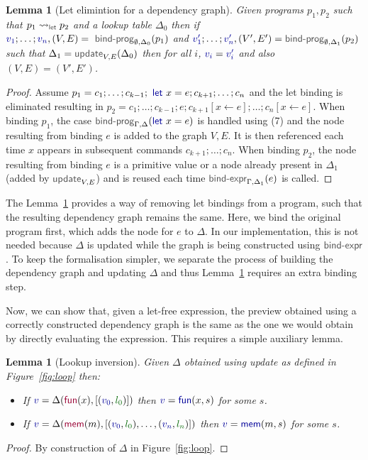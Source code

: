 \documentclass[acmsmall,anonymous,fleqn]{acmart}\settopmatter{printfolios=false,printccs=false,printacmref=false}
\newcounter{thc}
\theoremstyle{plain}
\newtheorem{lem}[thc]{Lemma}
\theoremstyle{definition}
\newcommand{\ident}[1]{\textnormal{\textcolor{idclr}{\sffamily #1}}}
\newcommand{\kvd}[1]{\textnormal{\textcolor{kvdclr}{\sffamily #1}}}
\newcommand{\bndclr}[1]{\textcolor{kvdclr}{#1}}
\newcommand{\blblclr}[1]{\textcolor{numclr}{#1}}
\newcommand{\bnd}[1]{\textnormal{\textcolor{kvdclr}{\sffamily #1}}}
\newcommand{\bknd}[1]{\textnormal{\textcolor{prepclr}{\sffamily #1}}}
\begin{document}
\begin{lem}[Let elimintion for a dependency graph]
\label{thm:let-grp-elimination}
Given programs $p_1, p_2$ such that $p_1 \rightsquigarrow_\ident{let} p_2$ and a lookup table
$\Delta_0$ then if $\bndclr{v_1}; \ldots; \bndclr{v_n}, (V, E) = \ident{bind-prog}_{\emptyset, \Delta_0}(p_1)$ and
$\bndclr{v'_1};\ldots;\bndclr{v'_n}, (V', E') = \ident{bind-prog}_{\emptyset, \Delta_1}(p_2)$ such that $\Delta_1 = \ident{update}_{V, E}(\Delta_0)$
then for all $i$, $\bndclr{v_i} = \bndclr{v'_i}$ and also $(V, E) = (V', E')$.
\end{lem}
\begin{proof}
Assume $p_1 = c_1; \ldots; c_{k-1}; \kvd{let}~x=e; c_{k+1};\ldots; c_n$ and the let binding is
eliminated resulting in $p_2 = c_1; \ldots; c_{k-1}; e; c_{k+1}[x\leftarrow e];\ldots; c_n[x\leftarrow e]$.
When binding $p_1$, the case $\ident{bind-prog}_{\Gamma,\Delta}(\kvd{let}~x=e)$ is handled using (7)
and the node resulting from binding $e$ is added to the graph $V, E$. It is then referenced each
time $x$ appears in subsequent commands $c_{k+1}; \ldots; c_n$.
When binding $p_2$, the node resulting from binding $e$ is a primitive value or a node already
present in $\Delta_1$ (added by $\ident{update}_{V, E}$) and is reused each time
$\ident{bind-expr}_{\Gamma,\Delta_1}(e)$ is called.
\end{proof}

The Lemma~\ref{thm:let-grp-elimination} provides a way of removing let bindings from a program,
such that the resulting dependency graph remains the same. Here, we bind the original program
first, which adds the node for $e$ to $\Delta$. In our implementation, this is not needed
because $\Delta$ is updated while the graph is being constructed using $\ident{bind-expr}$.
To keep the formalisation simpler, we separate the process of building the dependency graph
and updating $\Delta$ and thus Lemma~\ref{thm:let-grp-elimination} requires an extra binding step.

Now, we can show that, given a let-free expression, the preview obtained using a correctly
constructed dependency graph is the same as the one we would obtain by directly evaluating the
expression. This requires a simple auxiliary lemma.

\begin{lem}[Lookup inversion]
\label{thm:lemma-lookup}
Given $\Delta$ obtained using \ident{update} as defined in Figure~\ref{fig:loop} then:
\begin{itemize}
\raggedright
\item[--] If $\bndclr{v}=\Delta(\bknd{fun}(x),[(\bndclr{v_0}, \blblclr{l_0})])$
then $\bndclr{v}=\bnd{fun}(x, s)$ for some $s$.
\item[--] If $\bndclr{v}=\Delta(\bknd{mem}(m),[(\bndclr{v_0}, \blblclr{l_0}), \ldots, (\bndclr{v_n}, \blblclr{l_n})])$
then $\bndclr{v}=\bnd{mem}(m, s)$ for some $s$.
\end{itemize}
\end{lem}
\begin{proof}
By construction of $\Delta$ in Figure~\ref{fig:loop}.
\end{proof}
\end{document}
